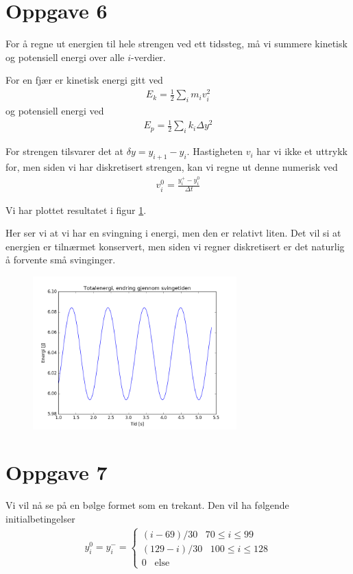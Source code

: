 \documentclass[norsk,a4,12pt,fleqn]{extarticle}
\begin{document}
\section*{Oppgave 6}
For å regne ut energien
til hele strengen ved ett
tidssteg, må vi summere
kinetisk og potensiell
energi over alle $i$-verdier.

For en fjær er kinetisk energi gitt ved
\begin{align}
    E_k = \frac{1}{2}\sum_i m_i v_i^2
\end{align}
og potensiell energi ved
\begin{align}
    E_p = \frac{1}{2}\sum_i k_i \Delta y^2
\end{align}

For strengen tilsvarer det at
$\delta y = y_{i+1} - y_i$.
Hastigheten $v_i$ har vi ikke et
uttrykk for, men siden vi har
diskretisert strengen, kan vi
regne ut denne numerisk ved
\begin{align}
    v_i^0 = \frac{y_i^+ - y_i^0}{\Delta t}
\end{align}

Vi har plottet resultatet i figur
\ref{fig:prob6}.

Her ser vi at vi har en svingning
i energi, men den er relativt
liten. Det vil si at energien
er tilnærmet konservert, men
siden vi regner diskretisert
er det naturlig å forvente
små svinginger.

\begin{figure}[H]
    \label{fig:prob6}
    \centering %
    \includegraphics[width=0.7\textwidth]{../src/problem6.png}
    \caption{} 
\end{figure} 

\section*{Oppgave 7}
Vi vil nå se på en bølge formet
som en trekant.
Den vil ha følgende initialbetingelser
\begin{align}
    y_i^0 = y_i^- =
    \begin{cases}
        (i-69)/30\;\;\;70\leq i\leq 99\\
        (129-i)/30\;\;\; 100\leq i \leq 128\\
        0\;\;\; \text{else}
    \end{cases}
\end{align}
\end{document}
